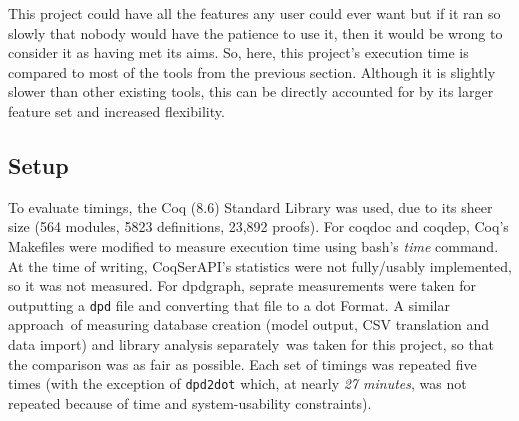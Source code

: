 This project could have all the features any user could ever want but if it ran
so slowly that nobody would have the patience to use it, then it would be wrong
to consider it as having met its aims. So, here, this project's execution time
is compared to most of the tools from the previous section. Although it is
slightly slower than other existing tools, this can be directly accounted for
by its larger feature set and increased flexibility.

\subsection{Setup}

To evaluate timings, the Coq (8.6) Standard Library was used, due to its sheer
size (564 modules, 5823 definitions, 23,892 proofs). For coqdoc and coqdep,
Coq's Makefiles were modified to measure execution time using bash's \emph{time}
command. At the time of writing, CoqSerAPI's statistics were not fully/usably
implemented, so it was not measured. For dpdgraph, seprate measurements were
taken for outputting a \texttt{dpd} file and converting that file to a dot
Format. A similar approach~\textendash of measuring database creation (model
output, CSV translation and data import) and library analysis
separately~\textendash was taken for this project, so that the comparison was as
fair as possible. Each set of timings was repeated five times (with the
exception of \texttt{dpd2dot} which, at nearly \emph{27 minutes}, was not
repeated because of time and system-usability constraints).

